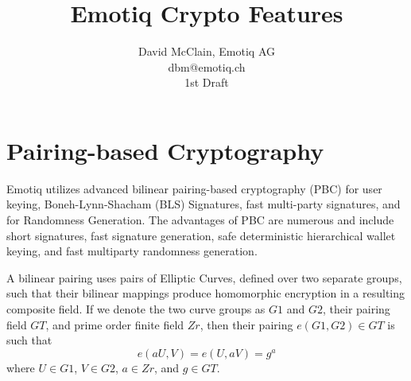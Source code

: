 \documentclass[article,oneside]{memoir}
\title{Emotiq Crypto Features}
\author{David McClain, Emotiq AG\\dbm@emotiq.ch\\1st Draft}
\begin{document}
\maketitle

\tableofcontents*




\chapter{Pairing-based Cryptography}

Emotiq utilizes advanced bilinear pairing-based cryptography\cite{thesis}\cite{lib} (PBC) for user keying, Boneh-Lynn-Shacham (BLS) Signatures\cite{bls}, fast multi-party signatures, and for Randomness Generation. The advantages of PBC are numerous and include short signatures, fast signature generation, safe deterministic hierarchical wallet keying, and fast multiparty randomness generation.

A bilinear pairing uses pairs of Elliptic Curves, defined over two separate groups, such that their bilinear mappings produce homomorphic encryption in a resulting composite field. If we denote the two curve groups as $G1$ and $G2$,  their pairing field $GT$, and prime order finite field $Zr$, then their pairing $e(G1,G2) \in GT$ is such that $$e(a U, V) = e(U, a V)= g^a$$ where $U \in G1$, $V \in G2$, $a \in Zr$, and $g \in GT$.
\end{document}
